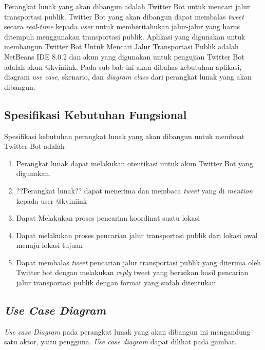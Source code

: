 Perangkat lunak yang akan dibangun adalah Twitter Bot untuk mencari jalur transportasi publik. Twitter Bot yang akan dibangun dapat membalas \textit{tweet} secara \textit{real-time} kepada \textit{user} untuk memberitahukan jalur-jalur yang harus ditempuh menggunakan transportasi publik. Aplikasi yang digunakan untuk membangun Twitter Bot Untuk Mencari Jalur Transportasi Publik adalah NetBeans IDE 8.0.2 dan akun yang digunakan untuk pengujian Twitter Bot adalah akun @kviniink. Pada sub bab ini akan dibahas kebutuhan aplikasi, diagram \textit{use case}, skenario, dan\textit{ diagram class} dari perangkat lunak yang akan dibangun.

\subsection{Spesifikasi Kebutuhan Fungsional}
Spesifikasi kebutuhan perangkat lunak yang akan dibangun untuk membuat Twitter Bot adalah
\begin{enumerate}
	\item Perangkat lunak dapat melakukan otentikasi untuk akun Twitter Bot yang digunakan.
	\item ??Perangkat lunak?? dapat menerima dan membaca \textit{tweet} yang di \textit{mention} kepada user @kviniink
	\item Dapat Melakukan proses pencarian koordinat suatu lokasi
	\item Dapat melakukan proses pencarian jalur transportasi publik dari lokasi awal menuju lokasi tujuan
	\item Dapat membalas \textit{tweet} pencarian jalur transportasi publik yang diterima oleh Twitter bot dengan melakukan \textit{reply} tweet yang berisikan hasil pencarian jalur transportasi publik dengan format yang sudah ditentukan.
\end{enumerate}

\subsection{\textit{Use Case Diagram}}
\textit{Use case Diagram} pada perangkat lunak yang akan dibangun ini mengandung satu aktor, yaitu pengguna. \textit{Use case diagram} dapat dilihat pada gambar.

